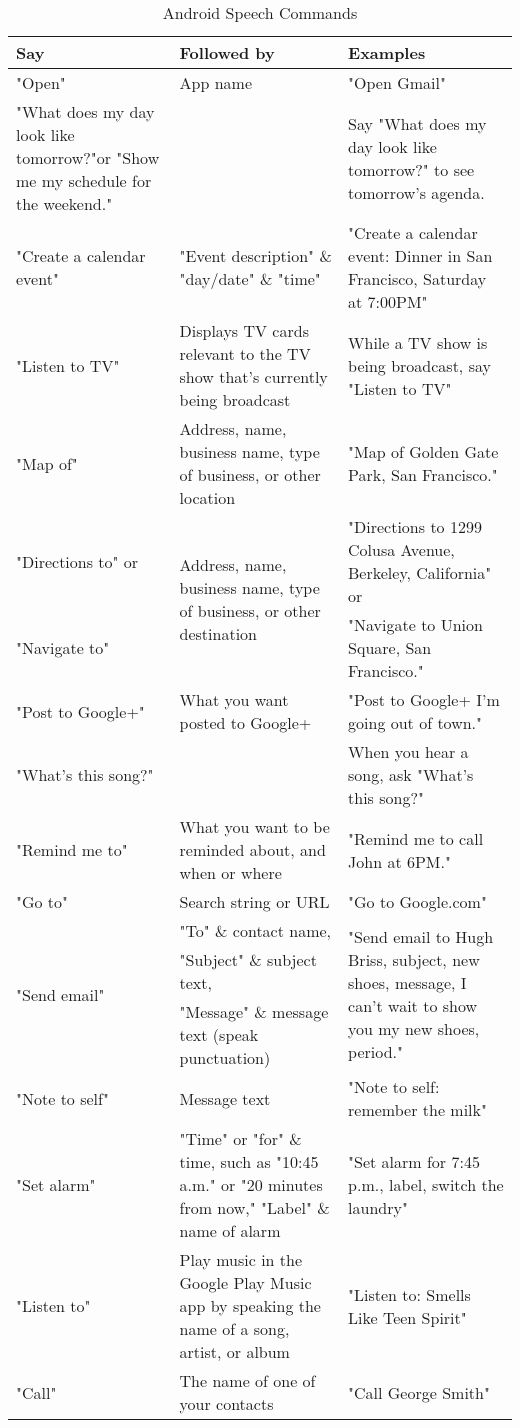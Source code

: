 \begin{table}[htbp]
  \centering
  \caption{Android Speech Commands}
    \begin{tabular}{lll}
    \toprule
    \textbf{Say} & \textbf{Followed by} & \textbf{Examples} \\
    \midrule
    "Open" & App name & "Open Gmail" \\
    "What does my day look like tomorrow?"or "Show me my schedule for the weekend." &       & Say "What does my day look like tomorrow?" to see tomorrow's agenda. \\
    "Create a calendar event" & "Event description" \& "day/date" \& "time" & "Create a calendar event: Dinner in San Francisco, Saturday at 7:00PM" \\
    "Listen to TV" & Displays TV cards relevant to the TV show that's currently being broadcast & While a TV show is being broadcast, say "Listen to TV" \\
    "Map of" & Address, name, business name, type of business, or other location & "Map of Golden Gate Park, San Francisco." \\
    "Directions to" or & \multirow{2}[2]{*}{Address, name, business name, type of business, or other destination} & "Directions to 1299 Colusa Avenue, Berkeley, California" or \\
    "Navigate to" &       & "Navigate to Union Square, San Francisco." \\
    "Post to Google+" & What you want posted to Google+ & "Post to Google+ I'm going out of town." \\
    "What's this song?" &       & When you hear a song, ask "What's this song?" \\
    "Remind me to" & What you want to be reminded about, and when or where & "Remind me to call John at 6PM." \\
    "Go to" & Search string or URL & "Go to Google.com" \\
    \multirow{3}[2]{*}{"Send email"} & "To" \& contact name, & \multirow{3}[2]{*}{"Send email to Hugh Briss, subject, new shoes, message, I can’t wait to show you my new shoes, period."} \\
          & "Subject" \& subject text, &  \\
          & "Message" \& message text (speak punctuation) &  \\
    "Note to self" & Message text & "Note to self: remember the milk" \\
    "Set alarm" & "Time" or "for" \& time, such as "10:45 a.m." or "20 minutes from now," "Label" \& name of alarm & "Set alarm for 7:45 p.m., label, switch the laundry" \\
    "Listen to" & Play music in the Google Play Music app by speaking the name of a song, artist, or album & "Listen to: Smells Like Teen Spirit" \\
    "Call" & The name of one of your contacts & "Call George Smith" \\
    \bottomrule
    \end{tabular}%
  \label{tab:addlabel}%
\end{table}%
